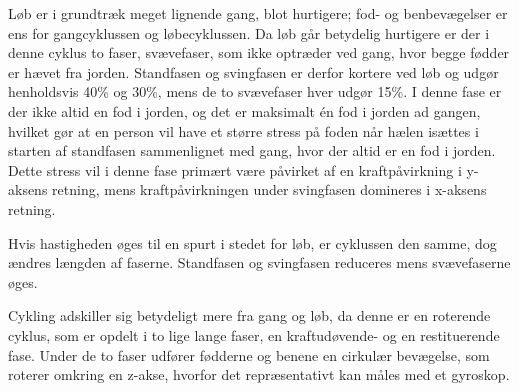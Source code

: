 Løb er i grundtræk meget lignende gang, blot hurtigere; fod- og benbevægelser er ens for gangcyklussen og løbecyklussen. Da løb går betydelig hurtigere er der i denne cyklus to faser, svævefaser, som ikke optræder ved gang, hvor begge fødder er hævet fra jorden. Standfasen og svingfasen er derfor kortere ved løb og udgør henholdsvis 40\% og 30\%, mens de to svævefaser hver udgør 15\%. \newline
I denne fase er der ikke altid en fod i jorden, og det er maksimalt én fod i jorden ad gangen, hvilket gør at en person vil have et større stress på foden når hælen isættes i starten af standfasen sammenlignet med gang, hvor der altid er en fod i jorden. Dette stress vil i denne fase primært være påvirket af en kraftpåvirkning i y-aksens retning, mens kraftpåvirkningen under svingfasen domineres i x-aksens retning.

Hvis hastigheden øges til en spurt i stedet for løb, er cyklussen den samme, dog ændres længden af faserne. Standfasen og svingfasen reduceres mens svævefaserne øges. \citep{Lee1998}

Cykling adskiller sig betydeligt mere fra gang og løb, da denne er en roterende cyklus, som er opdelt i to lige lange faser, en kraftudøvende- og en restituerende fase. Under de to faser udfører fødderne og benene en cirkulær bevægelse, som roterer omkring en z-akse, hvorfor det repræsentativt kan måles med et gyroskop. 
